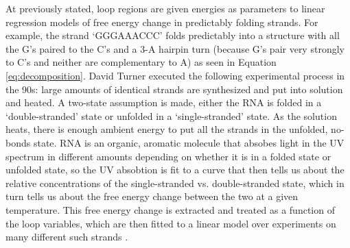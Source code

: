 At previously stated, loop regions are given energies as parameters to
linear regression models of free energy change in predictably folding
strands. For example, the strand `GGGAAACCC' folds predictably into a
structure with all the G's paired to the C's and a 3-A hairpin turn
(because G's pair very strongly to C's and neither are complementary
to A) as seen in Equation \ref{eq:decomposition}. David Turner
executed the following experimental process in the 90s: large amounts
of identical strands are synthesized and put into solution and
heated. A two-state assumption is made, either the RNA is folded in a
`double-stranded' state or unfolded in a `single-stranded' state. As
the solution heats, there is enough ambient energy to put all the
strands in the unfolded, no-bonds state. RNA is an organic, aromatic
molecule that absobes light in the UV spectrum in different amounts
depending on whether it is in a folded state or unfolded state, so the
UV absobtion is fit to a curve that then tells us about the relative
concentrations of the single-stranded vs. double-stranded state, which
in turn tells us about the free energy change between the two at a
given temperature. This free energy change is extracted and treated as
a function of the loop variables, which are then fitted to a linear
model over experiments on many different such strands
\cite{xia1998thermodynamic}.

